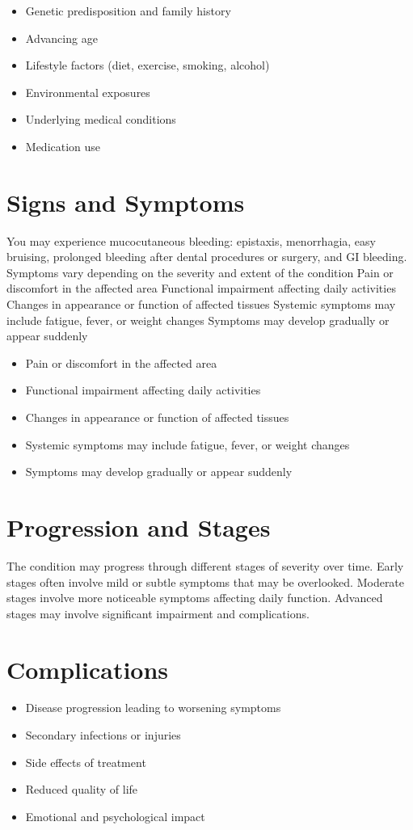 \begin{itemize}[noitemsep]
  \item Genetic predisposition and family history
  \item Advancing age
  \item Lifestyle factors (diet, exercise, smoking, alcohol)
  \item Environmental exposures
  \item Underlying medical conditions
  \item Medication use
\end{itemize}
\section{Signs and Symptoms}
You may experience mucocutaneous bleeding: epistaxis, menorrhagia, easy bruising, prolonged bleeding after dental procedures or surgery, and GI bleeding. Symptoms vary depending on the severity and extent of the condition Pain or discomfort in the affected area Functional impairment affecting daily activities Changes in appearance or function of affected tissues Systemic symptoms may include fatigue, fever, or weight changes Symptoms may develop gradually or appear suddenly

\begin{itemize}[noitemsep]
  \item Pain or discomfort in the affected area
  \item Functional impairment affecting daily activities
  \item Changes in appearance or function of affected tissues
  \item Systemic symptoms may include fatigue, fever, or weight changes
  \item Symptoms may develop gradually or appear suddenly
\end{itemize}
\section{Progression and Stages}
The condition may progress through different stages of severity over time. Early stages often involve mild or subtle symptoms that may be overlooked. Moderate stages involve more noticeable symptoms affecting daily function. Advanced stages may involve significant impairment and complications.
\section{Complications}
\begin{itemize}[noitemsep]
  \item Disease progression leading to worsening symptoms
  \item Secondary infections or injuries
  \item Side effects of treatment
  \item Reduced quality of life
  \item Emotional and psychological impact
\end{itemize}
